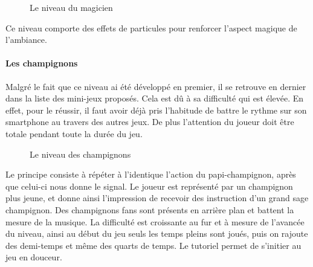 \begin{figure}[H]\centering
  \caption{Le niveau du magicien}
  \label{analytics}
\end{figure}

Ce niveau comporte des effets de particules pour renforcer l'aspect magique de l'ambiance.

\paragraph{Les champignons}

Malgré le fait que ce niveau ai été développé en premier, il se retrouve en dernier dans la liste des mini-jeux proposés. Cela est dû à sa difficulté qui est élevée. En effet, pour le réussir, il faut avoir déjà pris l'habitude de battre le rythme sur son smartphone au travers des autres jeux. De plus l'attention du joueur doit être totale pendant toute la durée du jeu.

\begin{figure}[H]\centering
  \caption{Le niveau des champignons}
  \label{analytics}
\end{figure}

Le principe consiste à répéter à l'identique l'action du papi-champignon, après que celui-ci nous donne le signal. Le joueur est représenté par un champignon plus jeune, et donne ainsi l'impression de recevoir des instruction d'un grand sage champignon. Des champignons fans sont présents en arrière plan et battent la mesure de la musique. La difficulté est croissante au fur et à mesure de l'avancée du niveau, ainsi au début du jeu seuls les temps pleins sont joués, puis on rajoute des demi-temps et même des quarts de temps. Le tutoriel permet de s'initier au jeu en douceur.